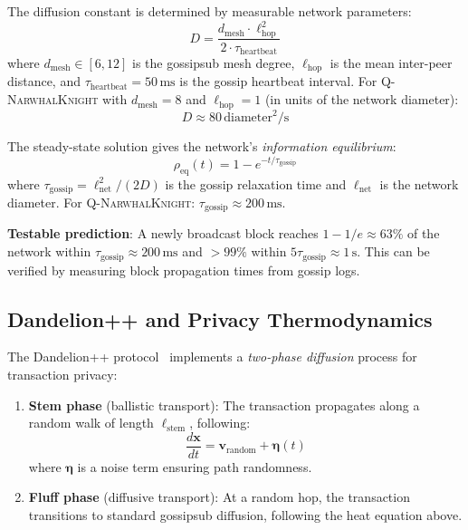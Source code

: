 \documentclass[12pt,a4paper,twocolumn]{article}
\newcommand{\qnk}{\textsc{Q-NarwhalKnight}}
\begin{document}
The diffusion constant is determined by measurable network parameters:
\begin{equation}
D = \frac{d_{\mathrm{mesh}} \cdot \ell^2_{\mathrm{hop}}}{2 \cdot \tau_{\mathrm{heartbeat}}}
\end{equation}
where $d_{\mathrm{mesh}} \in [6, 12]$ is the gossipsub mesh degree, $\ell_{\mathrm{hop}}$ is the mean inter-peer distance, and $\tau_{\mathrm{heartbeat}} = 50\,\text{ms}$ is the gossip heartbeat interval. For \qnk{} with $d_{\mathrm{mesh}} = 8$ and $\ell_{\mathrm{hop}} = 1$ (in units of the network diameter):
\begin{equation}
D \approx 80\,\text{diameter}^2/\text{s}
\end{equation}

The steady-state solution gives the network's \emph{information equilibrium}:
\begin{equation}
\rho_{\mathrm{eq}}(t) = 1 - e^{-t/\tau_{\mathrm{gossip}}}
\end{equation}
where $\tau_{\mathrm{gossip}} = \ell^2_{\mathrm{net}}/(2D)$ is the gossip relaxation time and $\ell_{\mathrm{net}}$ is the network diameter. For \qnk{}: $\tau_{\mathrm{gossip}} \approx 200\,\text{ms}$.

\textbf{Testable prediction}: A newly broadcast block reaches $1 - 1/e \approx 63\%$ of the network within $\tau_{\mathrm{gossip}} \approx 200\,\text{ms}$ and $>99\%$ within $5\tau_{\mathrm{gossip}} \approx 1\,\text{s}$. This can be verified by measuring block propagation times from gossip logs.

\subsection{Dandelion++ and Privacy Thermodynamics}

The Dandelion++ protocol~\cite{dandelion} implements a \emph{two-phase diffusion} process for transaction privacy:

\begin{enumerate}[leftmargin=*]
\item \textbf{Stem phase} (ballistic transport): The transaction propagates along a random walk of length $\ell_{\mathrm{stem}}$, following:
\begin{equation}
\frac{d\mathbf{x}}{dt} = \mathbf{v}_{\mathrm{random}} + \boldsymbol{\eta}(t)
\end{equation}
where $\boldsymbol{\eta}$ is a noise term ensuring path randomness.

\item \textbf{Fluff phase} (diffusive transport): At a random hop, the transaction transitions to standard gossipsub diffusion, following the heat equation above.
\end{enumerate}
\end{document}
